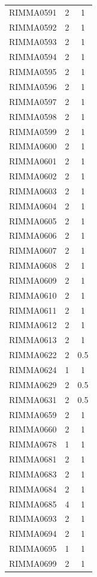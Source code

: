 \documentclass[11pt]{article}
\begin{document}
\begin{linenumbers}
\begin{flushleft}
\begin{table}[htbp]
\begin{tabular}{ccc}
    RIMMA0591 & 2     & 1 \\
    RIMMA0592 & 2     & 1 \\
    RIMMA0593 & 2     & 1 \\
    RIMMA0594 & 2     & 1 \\
    RIMMA0595 & 2     & 1 \\
    RIMMA0596 & 2     & 1 \\
    RIMMA0597 & 2     & 1 \\
    RIMMA0598 & 2     & 1 \\
    RIMMA0599 & 2     & 1 \\
    RIMMA0600 & 2     & 1 \\
    RIMMA0601 & 2     & 1 \\
    RIMMA0602 & 2     & 1 \\
    RIMMA0603 & 2     & 1 \\
    RIMMA0604 & 2     & 1 \\
    RIMMA0605 & 2     & 1 \\
    RIMMA0606 & 2     & 1 \\
    RIMMA0607 & 2     & 1 \\
    RIMMA0608 & 2     & 1 \\
    RIMMA0609 & 2     & 1 \\
    RIMMA0610 & 2     & 1 \\
    RIMMA0611 & 2     & 1 \\
    RIMMA0612 & 2     & 1 \\
    RIMMA0613 & 2     & 1 \\
    RIMMA0622 & 2     & 0.5 \\
    RIMMA0624 & 1     & 1 \\
    RIMMA0629 & 2     & 0.5 \\
    RIMMA0631 & 2     & 0.5 \\
    RIMMA0659 & 2     & 1 \\
    RIMMA0660 & 2     & 1 \\
    RIMMA0678 & 1     & 1 \\
    RIMMA0681 & 2     & 1 \\
    RIMMA0683 & 2     & 1 \\
    RIMMA0684 & 2     & 1 \\
    RIMMA0685 & 4     & 1 \\
    RIMMA0693 & 2     & 1 \\
    RIMMA0694 & 2     & 1 \\
    RIMMA0695 & 1     & 1 \\
    RIMMA0699 & 2     & 1 \\

\end{tabular}
\end{table}
\end{flushleft}
\end{linenumbers}
\end{document}
